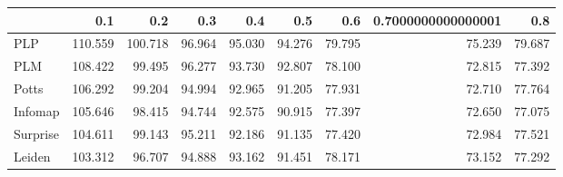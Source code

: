 \begin{tabular}{lrrrrrrrr}
\toprule
{} &     0.1 &     0.2 &    0.3 &    0.4 &    0.5 &    0.6 & 0.7000000000000001 &    0.8 \\
\midrule
PLP      & 110.559 & 100.718 & 96.964 & 95.030 & 94.276 & 79.795 &             75.239 & 79.687 \\
PLM      & 108.422 &  99.495 & 96.277 & 93.730 & 92.807 & 78.100 &             72.815 & 77.392 \\
Potts    & 106.292 &  99.204 & 94.994 & 92.965 & 91.205 & 77.931 &             72.710 & 77.764 \\
Infomap  & 105.646 &  98.415 & 94.744 & 92.575 & 90.915 & 77.397 &             72.650 & 77.075 \\
Surprise & 104.611 &  99.143 & 95.211 & 92.186 & 91.135 & 77.420 &             72.984 & 77.521 \\
Leiden   & 103.312 &  96.707 & 94.888 & 93.162 & 91.451 & 78.171 &             73.152 & 77.292 \\
\bottomrule
\end{tabular}

